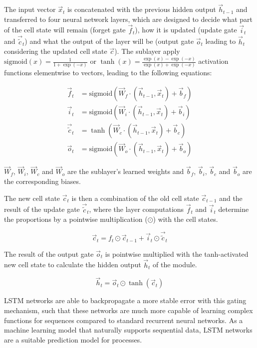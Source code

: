 The input vector $\vec{x}_t$ is concatenated with the previous hidden output $\vec{h}_{t-1}$ and transferred to four neural network layers, which are designed to decide what part of the cell state will remain (forget gate $\vec{f}_t$), how it is updated (update gate $\vec{i}_t$ and $\vec{\tilde{c}}_t$) and what the output of the layer will be (output gate $\vec{o}_t$ leading to $\vec{h}_t$ considering the updated cell state $\vec{c}$).
The sublayer apply $\text{sigmoid}(x) = \frac{1}{1+\exp({-x})}$ or $\tanh(x) = \frac{\exp({x}) - \exp({-x})}{\exp({x}) + \exp({-x})}$ activation functions elementwise to vectors, leading to the following equations:

\begin{align*}
\vec{f}_t & = \text{sigmoid}(\vec{W}_f \cdot (\vec{h}_{t-1}, \vec{x}_t) + \vec{b}_f) \\
\vec{i}_t & =  \text{sigmoid} (\vec{W}_i \cdot (\vec{h}_{t-1}, \vec{x}_t) + \vec{b}_i) \\
\vec{\tilde{c}}_t & = \tanh (\vec{W}_c \cdot (\vec{h}_{t-1}, \vec{x}_t) + \vec{b}_c) \\
\vec{o}_t & =  \text{sigmoid} (\vec{W}_o \cdot (\vec{h}_{t-1}, \vec{x}_t) + \vec{b}_o)
\end{align*}

$\vec{W}_f$, $\vec{W}_i$, $\vec{W}_c$ and $\vec{W}_o$ are the sublayer's learned weights and $\vec{b}_f$, $\vec{b}_i$, $\vec{b}_c$ and $\vec{b}_o$ are the corresponding biases.

The new cell state $\vec{c}_t$ is then a combination of the old cell state $\vec{c}_{t-1}$ and the result of the update gate $\vec{\tilde{c}}_t$, where the layer computations $\vec{f}_t$ and $\vec{i}_t$ determine the proportions by a pointwise multiplication ($\odot$) with the cell states.

\begin{equation*}
	\vec{c}_t = f_t \odot \vec{c}_{t-1} + \vec{i}_t \odot \vec{\tilde{c}}_t
\end{equation*}

The result of the output gate $\vec{o}_t$ is pointwise multiplied with the tanh-activated new cell state to calculate the hidden output $\vec{h}_t$ of the module.

\begin{equation*}
	\vec{h}_t = \vec{o}_t \odot \tanh(\vec{c}_t )
\end{equation*}

LSTM networks are able to backpropagate a more stable error with this gating mechanism, such that these networks are much more capable of learning complex functions for sequences compared to standard recurrent neural networks.
As a machine learning model that naturally supports sequential data, LSTM networks are a suitable prediction model for processes.